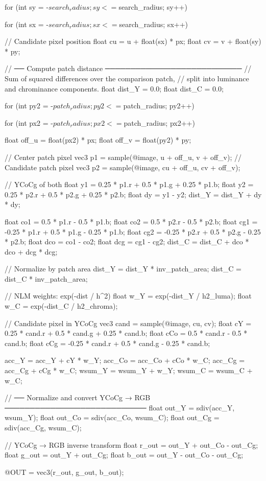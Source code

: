 for (int sy = -$search_radius; sy <= $search_radius; sy++) {
    for (int sx = -$search_radius; sx <= $search_radius; sx++) {
        // Candidate pixel position
        float cu = u + float(sx) * px;
        float cv = v + float(sy) * py;

        // ── Compute patch distance ───────────────────────────
        // Sum of squared differences over the comparison patch,
        // split into luminance and chrominance components.
        float dist_Y = 0.0;
        float dist_C = 0.0;

        for (int py2 = -$patch_radius; py2 <= $patch_radius; py2++) {
            for (int px2 = -$patch_radius; px2 <= $patch_radius; px2++) {
                float off_u = float(px2) * px;
                float off_v = float(py2) * py;

                // Center patch pixel
                vec3 p1 = sample(@image, u + off_u, v + off_v);
                // Candidate patch pixel
                vec3 p2 = sample(@image, cu + off_u, cv + off_v);

                // YCoCg of both
                float y1 = 0.25 * p1.r + 0.5 * p1.g + 0.25 * p1.b;
                float y2 = 0.25 * p2.r + 0.5 * p2.g + 0.25 * p2.b;
                float dy = y1 - y2;
                dist_Y = dist_Y + dy * dy;

                float co1 = 0.5 * p1.r - 0.5 * p1.b;
                float co2 = 0.5 * p2.r - 0.5 * p2.b;
                float cg1 = -0.25 * p1.r + 0.5 * p1.g - 0.25 * p1.b;
                float cg2 = -0.25 * p2.r + 0.5 * p2.g - 0.25 * p2.b;
                float dco = co1 - co2;
                float dcg = cg1 - cg2;
                dist_C = dist_C + dco * dco + dcg * dcg;
            }
        }

        // Normalize by patch area
        dist_Y = dist_Y * inv_patch_area;
        dist_C = dist_C * inv_patch_area;

        // NLM weights: exp(-dist / h^2)
        float w_Y = exp(-dist_Y / h2_luma);
        float w_C = exp(-dist_C / h2_chroma);

        // Candidate pixel in YCoCg
        vec3 cand = sample(@image, cu, cv);
        float cY  = 0.25 * cand.r + 0.5 * cand.g + 0.25 * cand.b;
        float cCo = 0.5 * cand.r - 0.5 * cand.b;
        float cCg = -0.25 * cand.r + 0.5 * cand.g - 0.25 * cand.b;

        acc_Y  = acc_Y  + cY  * w_Y;
        acc_Co = acc_Co + cCo * w_C;
        acc_Cg = acc_Cg + cCg * w_C;
        wsum_Y = wsum_Y + w_Y;
        wsum_C = wsum_C + w_C;
    }
}

// ── Normalize and convert YCoCg → RGB ────────────────────────────
float out_Y  = sdiv(acc_Y,  wsum_Y);
float out_Co = sdiv(acc_Co, wsum_C);
float out_Cg = sdiv(acc_Cg, wsum_C);

// YCoCg → RGB inverse transform
float r_out = out_Y + out_Co - out_Cg;
float g_out = out_Y + out_Cg;
float b_out = out_Y - out_Co - out_Cg;

@OUT = vec3(r_out, g_out, b_out);

